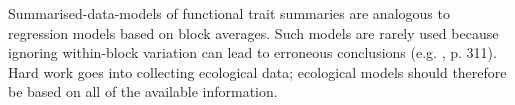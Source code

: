 \documentclass[12pt]{ecology}
\begin{document}


Summarised-data-models of functional trait summaries are analogous to regression models based on block averages.  Such models are rarely used because ignoring within-block variation can lead to erroneous conclusions (e.g. , p. 311).  Hard work goes into collecting ecological data; ecological models should therefore be based on all of the available information.






\end{document}
